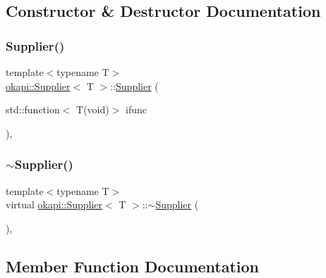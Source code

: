 \subsection{Constructor \& Destructor Documentation}
\mbox{\label{classokapi_1_1Supplier_a79da50ffa4a1f5b281915fd4200f361f}} 
\subsubsection{\texorpdfstring{Supplier()}{Supplier()}}
{\footnotesize\ttfamily template$<$typename T$>$ \\
\mbox{\hyperlink{classokapi_1_1Supplier}{okapi\+::\+Supplier}}$<$ T $>$\+::\mbox{\hyperlink{classokapi_1_1Supplier}{Supplier}} (\begin{DoxyParamCaption}\item[{std\+::function$<$ T(void)$>$}]{ifunc }\end{DoxyParamCaption})\hspace{0.3cm}{\ttfamily [inline]}, {\ttfamily [explicit]}}

\mbox{\label{classokapi_1_1Supplier_aa77c64ed86dd8a0e1ea712b085138ae3}} 
\subsubsection{\texorpdfstring{$\sim$Supplier()}{~Supplier()}}
{\footnotesize\ttfamily template$<$typename T$>$ \\
virtual \mbox{\hyperlink{classokapi_1_1Supplier}{okapi\+::\+Supplier}}$<$ T $>$\+::$\sim$\mbox{\hyperlink{classokapi_1_1Supplier}{Supplier}} (\begin{DoxyParamCaption}{ }\end{DoxyParamCaption})\hspace{0.3cm}{\ttfamily [virtual]}, {\ttfamily [default]}}



\subsection{Member Function Documentation}
\mbox{\label{classokapi_1_1Supplier_a38d76d4c3dcc19fd74f5349660199efe}} 

